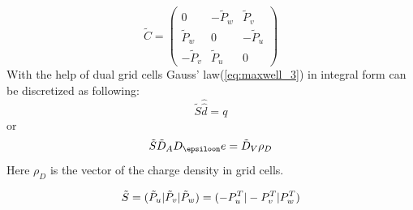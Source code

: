 \begin{equation}
\tilde{C}=
	\begin{pmatrix}
	0&-\tilde{P}_{w}&\tilde{P}_{v}\\
	\tilde{P}_{w}&0&-\tilde{P}_{u}\\
	-\tilde{P}_{v}&\tilde{P}_{u}&0
	\end{pmatrix}
	\label{eq:dual_C_matrix}
\end{equation}
With the help of dual grid cells Gauss' law(\ref{eq:maxwell_3}) in integral form can be discretized\cite{script_FeldSim} as following:
\begin{equation}
\tilde{S}\widehat{\widehat{d}}=q
\label{eq:gausslaw}
\end{equation}
or
\begin{equation}
\tilde{S}\tilde{D}_{A}D_{\epsiloon}e=\tilde{D}_{V}\rho_{D}
\label{eq:gausslaw_sample}
\end{equation}
Here $\rho_{D}$ is the vector of the charge density in grid cells.

\begin{equation}
\tilde{S}=(\tilde{P}_{u}|\tilde{P}_{v}|\tilde{P}_{w})=(-P_{u}^{T}|-P_{v}^{T}|\-P_{w}^{T})
\label{eq:dual_S_matrix}
\end{equation}



